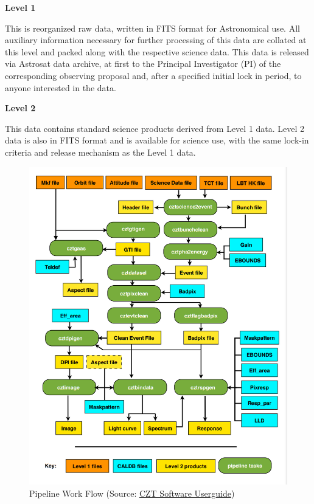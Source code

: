 \documentclass[11pt]{book} %
\begin{document}
\noindent\textbf{Level 1}

This is reorganized raw data, written in FITS format for Astronomical use. All auxiliary
information necessary for further processing of this data are collated at this level and
packed along with the respective science data. This data is released via Astrosat data
archive, at first to the Principal Investigator (PI) of the corresponding observing proposal
and, after a specified initial lock in period, to anyone interested in the data.

\noindent\textbf{Level 2}

This data contains standard science products derived from Level 1 data. Level 2 data is
also in FITS format and is available for science use, with the same lock-in criteria and
release mechanism as the Level 1 data.

\begin{figure}[H]
    \centering
    \includegraphics[scale=0.55]{Pictures/cztpipeline.png}
    \caption{Pipeline Work Flow (Source: \href{http://astrosat-ssc.iucaa.in/uploads/czti/CZTI_level2_software_userguide_V2.1.pdf}{CZT Software Userguide})}
\end{figure}
\end{document}
